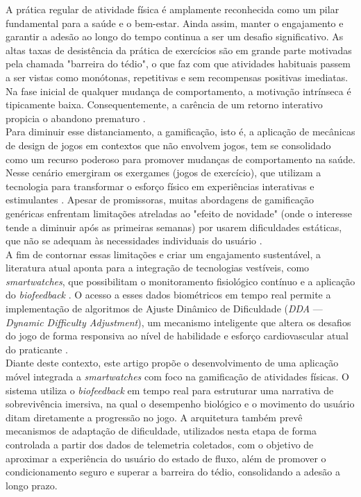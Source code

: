 A prática regular de atividade física é amplamente reconhecida como um pilar fundamental para a saúde e o bem-estar. Ainda assim, manter o engajamento e garantir a adesão ao longo do tempo continua a ser um desafio significativo. As altas taxas de desistência da prática de exercícios são em grande parte motivadas pela chamada "barreira do tédio", o que faz com que atividades habituais passem a ser vistas como monótonas, repetitivas e sem recompensas positivas imediatas. Na fase inicial de qualquer mudança de comportamento, a motivação intrínseca é tipicamente baixa. Consequentemente, a carência de um retorno interativo propicia o abandono prematuro \cite{plangger2022little}. \\ 
\indent Para diminuir esse distanciamento, a gamificação, isto é, a aplicação de mecânicas de design de jogos em contextos que não envolvem jogos, tem se consolidado como um recurso poderoso para promover mudanças de comportamento na saúde. Nesse cenário emergiram os exergames (jogos de exercício), que utilizam a tecnologia para transformar o esforço físico em experiências interativas e estimulantes \cite{li2025gamified}. Apesar de promissoras, muitas abordagens de gamificação genéricas enfrentam limitações atreladas ao "efeito de novidade" (onde o interesse tende a diminuir após as primeiras semanas) por usarem dificuldades estáticas, que não se adequam às necessidades individuais do usuário \cite{li2025gamified, helmi2024mediating}. \\
\indent A fim de contornar essas limitações e criar um engajamento sustentável, a literatura atual aponta para a integração de tecnologias vestíveis, como \textit{smartwatches}, que possibilitam o monitoramento fisiológico contínuo e a aplicação do \textit{biofeedback} \cite{bastos2023gamification, shukurova2025ai}. O acesso a esses dados biométricos em tempo real permite a implementação de algoritmos de Ajuste Dinâmico de Dificuldade (\textit{DDA} — \textit{Dynamic Difficulty Adjustment}), um mecanismo inteligente que altera os desafios do jogo de forma responsiva ao nível de habilidade e esforço cardiovascular atual do praticante \cite{li2025gamified}. \\
\indent Diante deste contexto, este artigo propõe o desenvolvimento de uma aplicação móvel integrada a \textit{smartwatches} com foco na gamificação de atividades físicas. O sistema utiliza o \textit{biofeedback} em tempo real para estruturar uma narrativa de sobrevivência imersiva, na qual o desempenho biológico e o movimento do usuário ditam diretamente a progressão no jogo. A arquitetura também prevê mecanismos de adaptação de dificuldade, utilizados nesta etapa de forma controlada a partir dos dados de telemetria coletados, com o objetivo de aproximar a experiência do usuário do estado de fluxo, além de promover o condicionamento seguro e superar a barreira do tédio, consolidando a adesão a longo prazo.
